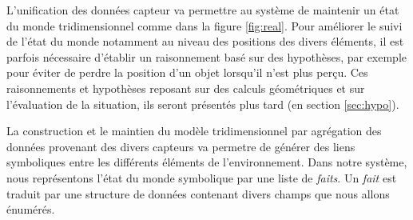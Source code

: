 \documentclass[a4paper,11pt,twoside]{StyleThese}
\begin{document}
L'unification des données capteur va permettre au système de maintenir un état du monde tridimensionnel comme dans la figure \ref{fig:real}. Pour améliorer le suivi de l'état du monde notamment au niveau des positions des divers éléments, il est parfois nécessaire d'établir un raisonnement basé sur des hypothèses, par exemple pour éviter de perdre la position d'un objet lorsqu'il n'est plus perçu. Ces raisonnements et hypothèses reposant sur des calculs géométriques et sur l'évaluation de la situation, ils seront présentés plus tard (en section \ref{sec:hypo}). 

La construction et le maintien du modèle tridimensionnel par agrégation des données provenant des divers capteurs va permetre de générer des liens symboliques entre les différents éléments de l'environnement. Dans notre système, nous représentons l'état du monde symbolique par une liste de \textit{faits}. Un \textit{fait} est traduit par une structure de données contenant divers champs que nous allons énumérés.
\end{document}
